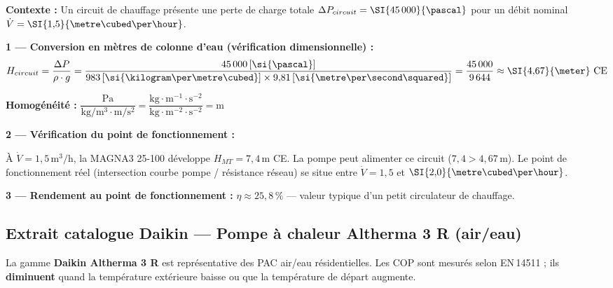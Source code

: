\begin{exemple}[title={Application — Lecture catalogue Grundfos MAGNA3}]
\textbf{Contexte :} Un circuit de chauffage présente une perte de charge totale
$\Delta P_{circuit} = \SI{45\,000}{\pascal}$ pour un débit nominal $\dot{V} = \SI{1{,}5}{\metre\cubed\per\hour}$.

\textbf{1 — Conversion en mètres de colonne d'eau (vérification dimensionnelle) :}
\[
  H_{circuit} = \frac{\Delta P}{\rho \cdot g}
  = \frac{45\,000\,[\si{\pascal}]}{983\,[\si{\kilogram\per\metre\cubed}] \times 9{,}81\,[\si{\metre\per\second\squared}]}
  = \frac{45\,000}{9\,644} \approx \SI{4{,}67}{\meter}~\text{CE}
\]

\textbf{Homogénéité :} $\dfrac{\mathrm{Pa}}{\mathrm{kg/m^3 \cdot m/s^2}}
= \dfrac{\mathrm{kg \cdot m^{-1} \cdot s^{-2}}}{\mathrm{kg \cdot m^{-2} \cdot s^{-2}}}
= \mathrm{m}$ \checkmark

\textbf{2 — Vérification du point de fonctionnement :}

À $\dot{V} = 1{,}5\,\mathrm{m^3/h}$, la MAGNA3 25-100 développe $H_{MT} = 7{,}4\,\mathrm{m}$ CE.
La pompe peut alimenter ce circuit ($7{,}4 > 4{,}67\,\mathrm{m}$).
Le point de fonctionnement réel (intersection courbe pompe / résistance réseau) se situe
entre $\dot{V} = 1{,}5$ et $\SI{2{,}0}{\metre\cubed\per\hour}$.

\textbf{3 — Rendement au point de fonctionnement :}
$\eta \approx 25{,}8\,\%$ — valeur typique d'un petit circulateur de chauffage.
\end{exemple}

\subsection{Extrait catalogue Daikin — Pompe à chaleur Altherma 3 R (air/eau)}

La gamme \textbf{Daikin Altherma 3 R} est représentative des PAC air/eau résidentielles.
Les COP sont mesurés selon EN\,14511 ; ils \textbf{diminuent} quand la température extérieure
baisse ou que la température de départ augmente.


